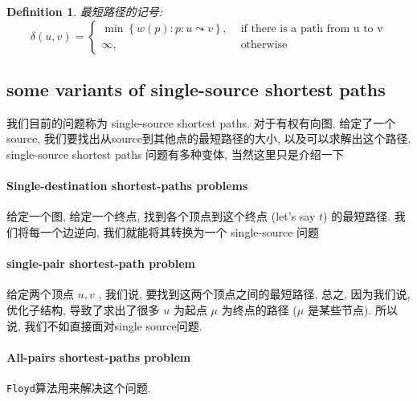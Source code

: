 \documentclass[a4paper, 10pt]{ctexart} %
\newtheorem{definition}{Definition}
\begin{document}
\begin{definition}
最短路径的记号: 
\[
\delta \left(u , v\right) = 
\begin{cases}
    \min \left\{w \left(p\right) : p: u \leadsto v \right\}, &\text{ if there is a path from u to v} \\
    \infty, & \text{ otherwise}
\end{cases}
\]
\end{definition}


\subsection{some variants of single-source shortest paths}
我们目前的问题称为 single-source shortest paths. 对于有权有向图, 给定了一个source, 我们要找出从source到其他点的最短路径的大小, 以及可以求解出这个路径. 
single-source shortest paths 问题有多种变体, 当然这里只是介绍一下

\paragraph{Single-destination shortest-paths problems} %
\label{par:Single-destination shortest-paths problems}
给定一个图, 给定一个终点, 找到各个顶点到这个终点 (let's say $t$) 的最短路径. 
我们将每一个边逆向, 我们就能将其转换为一个 single-source 问题
\paragraph{single-pair shortest-path problem} %
\label{par:single-pair shortest-path problem}
给定两个顶点 $ u , v$ , 我们说, 要找到这两个顶点之间的最短路径, 
总之, 因为我们说, 优化子结构, 导致了求出了很多 $u$ 为起点 $\mu$ 
为终点的路径 ($\mu$ 是某些节点). 所以说, 我们不如直接面对single source问题.
\paragraph{All-pairs shortest-paths problem} %
\label{par:All-pairs shortest-paths problem}
\verb|Floyd|算法用来解决这个问题.
\end{document}
